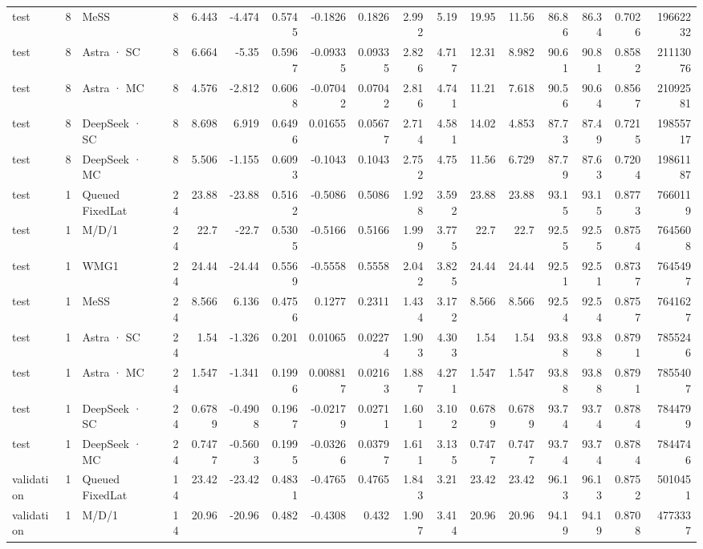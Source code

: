 \begin{tabular}{lrlrrrrrrrrrrrrrr}
test & 8 & MeSS & 8 & 6.443 & -4.474 & 0.5745 & -0.1826 & 0.1826 & 2.992 & 5.19 & 19.95 & 11.56 & 86.86 & 86.34 & 0.7026 & 19662232 \\
test & 8 & Astra · SC & 8 & 6.664 & -5.35 & 0.5967 & -0.09335 & 0.09335 & 2.826 & 4.717 & 12.31 & 8.982 & 90.61 & 90.81 & 0.8582 & 21113076 \\
test & 8 & Astra · MC & 8 & 4.576 & -2.812 & 0.6068 & -0.07042 & 0.07042 & 2.816 & 4.741 & 11.21 & 7.618 & 90.56 & 90.64 & 0.8567 & 21092581 \\
test & 8 & DeepSeek · SC & 8 & 8.698 & 6.919 & 0.6496 & 0.01655 & 0.05677 & 2.714 & 4.581 & 14.02 & 4.853 & 87.73 & 87.49 & 0.7215 & 19855717 \\
test & 8 & DeepSeek · MC & 8 & 5.506 & -1.155 & 0.6093 & -0.1043 & 0.1043 & 2.752 & 4.75 & 11.56 & 6.729 & 87.79 & 87.63 & 0.7204 & 19861187 \\
test & 1 & Queued FixedLat & 24 & 23.88 & -23.88 & 0.5162 & -0.5086 & 0.5086 & 1.928 & 3.592 & 23.88 & 23.88 & 93.15 & 93.15 & 0.8773 & 7660119 \\
test & 1 & M/D/1 & 24 & 22.7 & -22.7 & 0.5305 & -0.5166 & 0.5166 & 1.999 & 3.775 & 22.7 & 22.7 & 92.55 & 92.55 & 0.8754 & 7645608 \\
test & 1 & WMG1 & 24 & 24.44 & -24.44 & 0.5569 & -0.5558 & 0.5558 & 2.042 & 3.825 & 24.44 & 24.44 & 92.51 & 92.51 & 0.8737 & 7645497 \\
test & 1 & MeSS & 24 & 8.566 & 6.136 & 0.4756 & 0.1277 & 0.2311 & 1.434 & 3.172 & 8.566 & 8.566 & 92.54 & 92.54 & 0.8757 & 7641627 \\
test & 1 & Astra · SC & 24 & 1.54 & -1.326 & 0.201 & 0.01065 & 0.02274 & 1.903 & 4.303 & 1.54 & 1.54 & 93.88 & 93.88 & 0.8791 & 7855246 \\
test & 1 & Astra · MC & 24 & 1.547 & -1.341 & 0.1996 & 0.008817 & 0.02163 & 1.887 & 4.271 & 1.547 & 1.547 & 93.88 & 93.88 & 0.8791 & 7855407 \\
test & 1 & DeepSeek · SC & 24 & 0.6789 & -0.4908 & 0.1967 & -0.02179 & 0.02711 & 1.601 & 3.102 & 0.6789 & 0.6789 & 93.74 & 93.74 & 0.8784 & 7844799 \\
test & 1 & DeepSeek · MC & 24 & 0.7477 & -0.5603 & 0.1995 & -0.03266 & 0.03797 & 1.611 & 3.135 & 0.7477 & 0.7477 & 93.74 & 93.74 & 0.8784 & 7844746 \\
validation & 1 & Queued FixedLat & 14 & 23.42 & -23.42 & 0.4831 & -0.4765 & 0.4765 & 1.843 & 3.21 & 23.42 & 23.42 & 96.13 & 96.13 & 0.8752 & 5010451 \\
validation & 1 & M/D/1 & 14 & 20.96 & -20.96 & 0.482 & -0.4308 & 0.432 & 1.907 & 3.414 & 20.96 & 20.96 & 94.19 & 94.19 & 0.8708 & 4773337 \\

\end{tabular}
